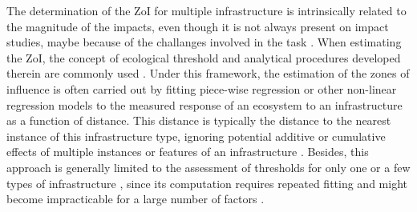\documentclass[titlepage]{article}
\begin{document}
The determination of the ZoI for multiple infrastructure is intrinsically related to the magnitude of the impacts, even though it is not always present on impact studies, maybe because of the challanges involved in the task  \citep{quinonezpinon_design_2007}. When estimating the ZoI, the concept of ecological threshold \citep{huggett_concept_2005} and analytical procedures developed therein are commonly used \citep{ficetola_ecological_2009}. Under this framework, the estimation of the zones of influence is often carried out by fitting piece-wise regression or other non-linear regression models \citep[such as an exponential decay or generalized additive models;][]{skarin_out_2018, ficetola_ecological_2009} to the measured response of an ecosystem to an infrastructure as a function of distance. This distance is typically the distance to the nearest instance of this infrastructure type, ignoring potential additive or cumulative effects of multiple instances or features of an infrastructure \citep[e.g ][Box 1]{torres_assessing_2016}. Besides, this approach is generally limited to the assessment of thresholds for only one or a few types of infrastructure \citep[e.g.][]{boulanger_estimating_2012}, since its computation requires repeated fitting and might become impracticable for a large number of factors \citep{lee_estimating_2020}. 
\end{document}
